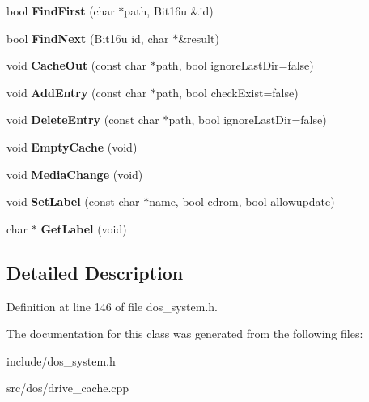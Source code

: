 \begin{DoxyCompactItemize}
\item 
\hypertarget{classDOS__Drive__Cache_ae19e2c7e6730d76b492bbc62d0edb38f}{bool {\bfseries Find\-First} (char $\ast$path, Bit16u \&id)}\label{classDOS__Drive__Cache_ae19e2c7e6730d76b492bbc62d0edb38f}

\item 
\hypertarget{classDOS__Drive__Cache_a8c3297b5ea4a5b10ccf1e9bfd6e4b2c6}{bool {\bfseries Find\-Next} (Bit16u id, char $\ast$\&result)}\label{classDOS__Drive__Cache_a8c3297b5ea4a5b10ccf1e9bfd6e4b2c6}

\item 
\hypertarget{classDOS__Drive__Cache_ac1cf68069ab790fb1b3a35686b3625c6}{void {\bfseries Cache\-Out} (const char $\ast$path, bool ignore\-Last\-Dir=false)}\label{classDOS__Drive__Cache_ac1cf68069ab790fb1b3a35686b3625c6}

\item 
\hypertarget{classDOS__Drive__Cache_a88416281f2c92dbd802bf1cc77153bdb}{void {\bfseries Add\-Entry} (const char $\ast$path, bool check\-Exist=false)}\label{classDOS__Drive__Cache_a88416281f2c92dbd802bf1cc77153bdb}

\item 
\hypertarget{classDOS__Drive__Cache_a68d34280ef1d383e84f98f2df46de333}{void {\bfseries Delete\-Entry} (const char $\ast$path, bool ignore\-Last\-Dir=false)}\label{classDOS__Drive__Cache_a68d34280ef1d383e84f98f2df46de333}

\item 
\hypertarget{classDOS__Drive__Cache_a37fc4a803fa8ac753d3e084ee52e0daf}{void {\bfseries Empty\-Cache} (void)}\label{classDOS__Drive__Cache_a37fc4a803fa8ac753d3e084ee52e0daf}

\item 
\hypertarget{classDOS__Drive__Cache_a6015de7335a108069e32a1fdebfcd890}{void {\bfseries Media\-Change} (void)}\label{classDOS__Drive__Cache_a6015de7335a108069e32a1fdebfcd890}

\item 
\hypertarget{classDOS__Drive__Cache_af5f0e25edd0f18d6ccaeb7349ec412a3}{void {\bfseries Set\-Label} (const char $\ast$name, bool cdrom, bool allowupdate)}\label{classDOS__Drive__Cache_af5f0e25edd0f18d6ccaeb7349ec412a3}

\item 
\hypertarget{classDOS__Drive__Cache_a5226fd65de22dc1ed73103dce3b6d668}{char $\ast$ {\bfseries Get\-Label} (void)}\label{classDOS__Drive__Cache_a5226fd65de22dc1ed73103dce3b6d668}

\end{DoxyCompactItemize}


\subsection{Detailed Description}


Definition at line 146 of file dos\-\_\-system.\-h.



The documentation for this class was generated from the following files\-:\begin{DoxyCompactItemize}
\item 
include/dos\-\_\-system.\-h\item 
src/dos/drive\-\_\-cache.\-cpp\end{DoxyCompactItemize}

